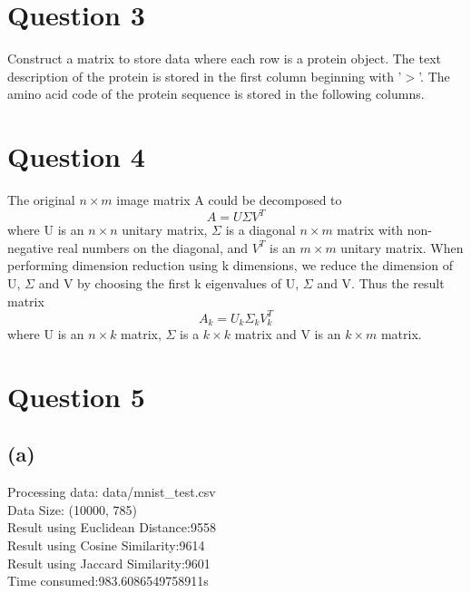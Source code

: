 \documentclass[a4paper]{article}
\begin{document}
\section{Question 3}
Construct a matrix to store data where each row is a protein object. The text description of the protein is stored in the first column beginning with '$>$'. The amino acid code of the protein sequence is stored in the following columns.
\section{Question 4}
The original $n\times m$ image matrix A could be decomposed to
$$A = U\Sigma V^{T}$$
where U is an $n\times n$ unitary matrix, $\Sigma$ is a diagonal $n\times m$ matrix with non-negative real numbers on the diagonal, and $V^{T}$ is an $m\times m$ unitary matrix. When performing dimension reduction using k dimensions, we reduce the dimension of U, $\Sigma$ and V by choosing the first k eigenvalues of U, $\Sigma$ and V. Thus the result matrix
$$A_{k} = U_{k}\Sigma_{k}V^{T}_{k}$$
where U is an $n\times k$ matrix, $\Sigma$ is a $k\times k$ matrix and V is an $k\times m$ matrix.
\section{Question 5}
\subsection{(a)}
Processing data: data/mnist\_test.csv
\\Data Size: (10000, 785)
\\Result using Euclidean Distance:9558
\\Result using Cosine Similarity:9614
\\Result using Jaccard Similarity:9601
\\Time consumed:983.6086549758911s
\end{document}
